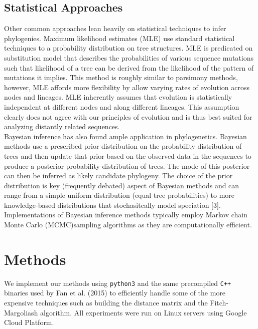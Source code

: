 \documentclass[a4paper]{article}
\begin{document}
\begin{multicols}{2}
\subsection{Statistical Approaches}
Other common approaches lean heavily on statistical techniques to infer phylogenies. Maximum likelihood estimates (MLE) use standard statistical techniques to a probability distribution on tree structures. MLE is predicated on substitution model that describes the probabilities of various sequence mutations such that likelihood of a tree can be derived from the likelihood of the pattern of mutations it implies. This method is roughly similar to parsimony methods, however, MLE affords more flexibility by allow varying rates of evolution across nodes and lineages. MLE inherently assumes that evolution is statistically independent at different nodes and along different lineages. This assumption clearly does not agree with our principles of evolution and is thus best suited for analyzing distantly related sequences.\\

Bayesian inference has also found ample application in phylogenetics. Bayesian methods use a prescribed prior distribution on the probability distribution of trees and then update that prior based on the observed data in the sequences to produce a posterior probability distribution of trees. The mode of this posterior can then be inferred as likely candidate phylogeny. The choice of the prior distribution is key (frequently debated) aspect of Bayesian methods and can range from a simple uniform distribution (equal tree probabilities) to more knowledge-based distributions that stochasitcally model speciation [3]. Implementations of Bayesian inference methods typically employ Markov chain Monte Carlo (MCMC)sampling algorithms as they are computationally efficient.


\section{Methods}
We implement our methods using \texttt{python3} and the same precompiled \texttt{C++} binaries used by Fan et al. (2015) to efficiently handle some of the more expensive techniques such as building the distance matrix and the Fitch-Margoliash algorithm. All experiments were run on Linux servers using Google Cloud Platform.

\end{multicols}
\end{document}
